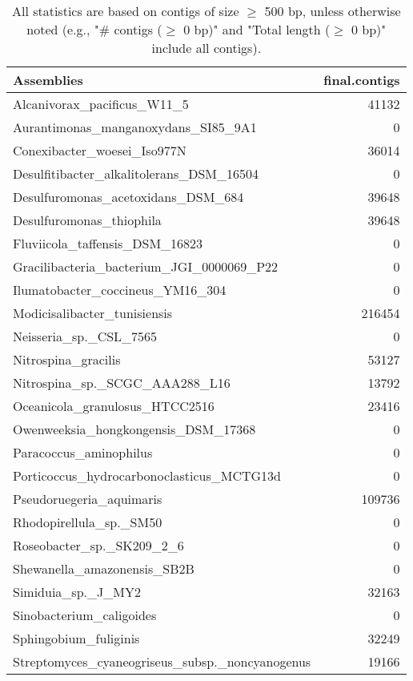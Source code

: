 \documentclass[12pt,a4paper]{article}
\begin{document}
\begin{table}[ht]
\begin{center}
\caption{All statistics are based on contigs of size $\geq$ 500 bp, unless otherwise noted (e.g., "\# contigs ($\geq$ 0 bp)" and "Total length ($\geq$ 0 bp)" include all contigs).}
\begin{tabular}{|l*{1}{|r}|}
\hline
Assemblies & final.contigs \\ \hline
Alcanivorax\_pacificus\_W11\_5 & 41132 \\ \hline
Aurantimonas\_manganoxydans\_SI85\_9A1 & 0 \\ \hline
Conexibacter\_woesei\_Iso977N & 36014 \\ \hline
Desulfitibacter\_alkalitolerans\_DSM\_16504 & 0 \\ \hline
Desulfuromonas\_acetoxidans\_DSM\_684 & 39648 \\ \hline
Desulfuromonas\_thiophila & 39648 \\ \hline
Fluviicola\_taffensis\_DSM\_16823 & 0 \\ \hline
Gracilibacteria\_bacterium\_JGI\_0000069\_P22 & 0 \\ \hline
Ilumatobacter\_coccineus\_YM16\_304 & 0 \\ \hline
Modicisalibacter\_tunisiensis & 216454 \\ \hline
Neisseria\_sp.\_CSL\_7565 & 0 \\ \hline
Nitrospina\_gracilis & 53127 \\ \hline
Nitrospina\_sp.\_SCGC\_AAA288\_L16 & 13792 \\ \hline
Oceanicola\_granulosus\_HTCC2516 & 23416 \\ \hline
Owenweeksia\_hongkongensis\_DSM\_17368 & 0 \\ \hline
Paracoccus\_aminophilus & 0 \\ \hline
Porticoccus\_hydrocarbonoclasticus\_MCTG13d & 0 \\ \hline
Pseudoruegeria\_aquimaris & 109736 \\ \hline
Rhodopirellula\_sp.\_SM50 & 0 \\ \hline
Roseobacter\_sp.\_SK209\_2\_6 & 0 \\ \hline
Shewanella\_amazonensis\_SB2B & 0 \\ \hline
Simiduia\_sp.\_J\_MY2 & 32163 \\ \hline
Sinobacterium\_caligoides & 0 \\ \hline
Sphingobium\_fuliginis & 32249 \\ \hline
Streptomyces\_cyaneogriseus\_subsp.\_noncyanogenus & 19166 \\ \hline

\end{tabular}
\end{center}
\end{table}
\end{document}
